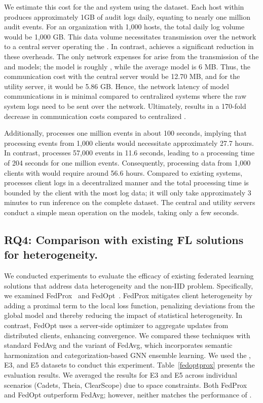  We estimate this cost for the \flash and \kairos system using the \optc dataset. Each host within \optc produces approximately 1GB of audit logs daily, equating to nearly one million audit events. For an organization with 1,000 hosts, the total daily log volume would be 1,000 GB. This data volume necessitates transmission over the network to a central server operating the \pids. In contrast, \Sys achieves a significant reduction in these overheads. The only network expenses for \Sys arise from the transmission of the \gnnshort and \wordvec models; the \gnnshort model is roughly \modelsize, while the average \wordvec model is 6 MB. Thus, the communication cost with the central server would be 12.70 MB, and for the utility server, it would be 5.86 GB. Hence, the network latency of model communications in \Sys is minimal compared to centralized systems where the raw system logs need to be sent over the network. Ultimately, \Sys results in a 170-fold decrease in communication costs compared to centralized \pids.  

 Additionally, \flash processes one million events in about 100 seconds, implying that processing events from 1,000 clients would necessitate approximately 27.7 hours. In contrast, \kairos processes 57,000 events in 11.6 seconds, leading to a processing time of 204 seconds for one million events. Consequently, processing data from 1,000 clients with \kairos would require around 56.6 hours. Compared to existing systems, \Sys processes client logs in a decentralized manner and the total processing time is bounded by the client with the most log data; it will only take approximately 3 minutes to run inference on the complete \optc dataset. The central and utility servers conduct a simple mean operation on the models, taking only a few seconds.

\subsection{RQ4: Comparison with existing FL solutions for heterogeneity.}
\label{sec:fedalternatives}

We conducted experiments to evaluate the efficacy of existing federated learning solutions that address data heterogeneity and the non-IID problem. Specifically, we examined FedProx~\cite{li2020federated} and FedOpt~\cite{asad2020fedopt}. FedProx mitigates client heterogeneity by adding a proximal term to the local loss function, penalizing deviations from the global model and thereby reducing the impact of statistical heterogeneity. In contrast, FedOpt uses a server-side optimizer to aggregate updates from distributed clients, enhancing convergence. We compared these techniques with standard FedAvg and the \Sys variant of FedAvg, which incorporates semantic harmonization and categorization-based GNN ensemble learning. We used the \optc, E3, and E5 datasets to conduct this experiment. Table~\ref{fedoptprox} presents the evaluation results. We averaged the results for E3 and E5 across individual scenarios (Cadets, Theia, ClearScope) due to space constraints. Both FedProx and FedOpt outperform FedAvg; however, neither matches the performance of \Sys.


